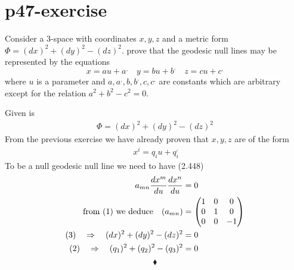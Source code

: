 \section{p47-exercise }
\begin{tcolorbox}
Consider a 3-space with coordinates $x,y,z$ and a metric form $\Phi = (dx)^2+(dy)^2 - (dz)^2$. prove that the geodesic null lines may be represented by the equations
$$x = au + a^,\quad y = bu + b^, \quad z = cu + c^,$$
where $u$ is a parameter and $a, a^,,b,b^,,c,c^,$ are constants which are arbitrary except for the relation $a^2+b^2-c^2 =0$.
\end{tcolorbox}
Given is 
\begin{align}
\Phi = (dx)^2+(dy)^2 - (dz)^2
\end{align}
From the previous exercise we have already proven that $x,y,z$ are of the form
\begin{align}
\ x^i = q_i u + q_i^,
\end{align}
To be a null geodesic null line we need to have (2.448)
\begin{align}
\ a_{mn}\dv{x^m}{u}\dv{x^n}{u} &=0\\
\text{from (1) we deduce}  \quad (a_{mn}) &= \begin{pmatrix}
1& 0 & 0 \\
 0&1  & 0 \\
 0&  0& -1 \\
\end{pmatrix}\\
\text{(3)}\quad\Rightarrow\quad (dx)^2+(dy)^2 - (dz)^2 &=0\\
\text{(2)}\quad\Rightarrow\quad (q_1)^2+(q_2)^2 - (q_3)^2 &=0
\end{align}
$$\blacklozenge$$
\newpage

